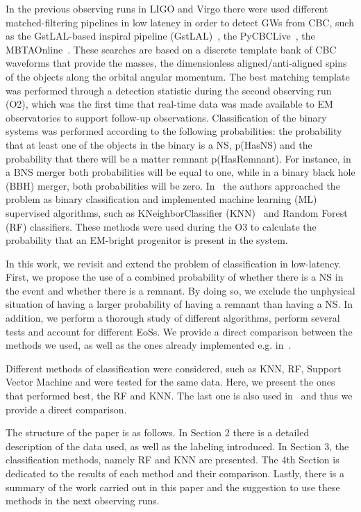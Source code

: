  
In the previous observing runs in LIGO and Virgo there were used different 
matched-filtering pipelines in low latency in order to detect GWs from CBC, 
such as the GstLAL-based inspiral pipeline (GstLAL)~\cite{Sachdev:2020lfd}, 
the PyCBCLive~\cite{Nitz_2018}, the MBTAOnline~\cite{Adams_2016}. 
These searches are based on a discrete template bank of CBC waveforms 
that provide the masses, the dimensionless aligned/anti-aligned spins of the 
objects along the orbital angular momentum. The best matching template 
was performed through a detection statistic during the second observing run 
(O2), which was the first time that real-time data was made available to EM 
observatories to support follow-up observations. Classification of the binary 
systems was performed according to the following probabilities: the 
probability that at least one of the objects in the binary is a NS, p(HasNS) 
and the probability that there will be a matter remnant p(HasRemnant). For 
instance, in a BNS merger both probabilities will be equal to one, while in a 
binary black hole (BBH) merger, both probabilities will be zero. 
In~\cite{Chatterjee:2019avs} the authors approached the problem as binary 
classification and implemented machine learning (ML) supervised algorithms, 
such as KNeighborClassifier (KNN)~\cite{Pedregosa:2011ork} and Random 
Forest (RF) classifiers. These methods were used during the O3 to 
calculate the probability that an EM-bright progenitor is present in the 
system.


In this work, we revisit and extend the problem of classification in low-latency. 
First, we propose the use of a combined probability of whether there is a NS 
in the event and whether there is a remnant. By doing so, we exclude the 
unphysical situation of having a larger probability of having a remnant than 
having a NS. In addition, we perform a thorough study of different algorithms, 
perform several tests and account for different EoSs. We provide a direct 
comparison between the methods we used, as well as the ones already 
implemented e.g. in~\cite{Chatterjee:2019avs}. 

Different methods of classification were considered, such as KNN, RF, 
Support Vector Machine and were tested for the same data. Here, we 
present the ones that performed best, the RF and KNN. The last one is 
also used in~\cite{Chatterjee:2019avs} and thus we provide a direct 
comparison. 

The structure of the paper is as follows. In Section 2 there is a detailed 
description of the data used, as well as the labeling introduced. In 
Section 3, the classification methods, namely RF and KNN are presented. 
The 4th Section is dedicated to the results of each method and their 
comparison. Lastly, there is a summary of the work carried out in this 
paper and the suggestion to use these methods in the next observing 
runs.
